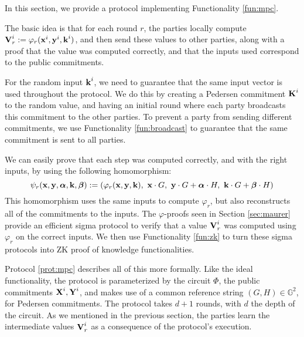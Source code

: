 In this section, we provide a protocol implementing Functionality
\ref{fun:mpc}.

The basic idea is that for each round $r$, the parties locally
compute $\textbf{V}^i_r := \varphi_r(\textbf{x}^i, \textbf{y}^i, \textbf{k}^i)$, and then
send these values to other parties, along with a proof that
the value was computed correctly, and that the inputs used correspond
to the public commitments.

For the random input $\textbf{k}^i$, we need to guarantee that the same
input vector is used throughout the protocol.
We do this by creating a Pedersen commitment $\textbf{K}^i$ to the random value,
and having an initial round where each party broadcasts this commitment
to the other parties.
To prevent a party from sending different commitments, we
use Functionality \ref{fun:broadcast} to guarantee that the same
commitment is sent to all parties.

We can easily prove that each step was computed correctly, and with the right
inputs, by using the following homomorphism:
$$
\psi_r(\textbf{x}, \textbf{y}, \boldsymbol{\alpha}, \textbf{k}, \boldsymbol{\beta})
:= (\varphi_r(\textbf{x}, \textbf{y}, \textbf{k}),\ \textbf{x} \cdot G,\ \textbf{y} \cdot G + \boldsymbol{\alpha} \cdot H,\
\textbf{k} \cdot G + \boldsymbol{\beta} \cdot H) 
$$
This homomorphism uses the same inputs to compute $\varphi_r$,
but also reconstructs all of the commitments to the inputs.
The $\varphi$-proofs seen in Section \ref{sec:maurer}
provide an efficient sigma protocol to verify
that a value $\textbf{V}^i_r$ was computed using $\varphi_r$ on the correct
inputs.
We then use Functionality \ref{fun:zk} to turn these sigma protocols
into ZK proof of knowledge functionalities.

Protocol \ref{prot:mpc} describes all of this more formally.
Like the ideal functionality, the protocol is parameterized by
the circuit $\Phi$, the public commitments $\textbf{X}^i, \textbf{Y}^i$, and makes
use of a common reference string $(G, H) \in \mathbb{G}^2$, for Pedersen
commitments.
The protocol takes $d + 1$ rounds, with $d$ the depth of the circuit.
As we mentioned in the previous section, the parties learn
the intermediate values $\textbf{V}^i_r$ as a consequence of the protocol's
execution.

